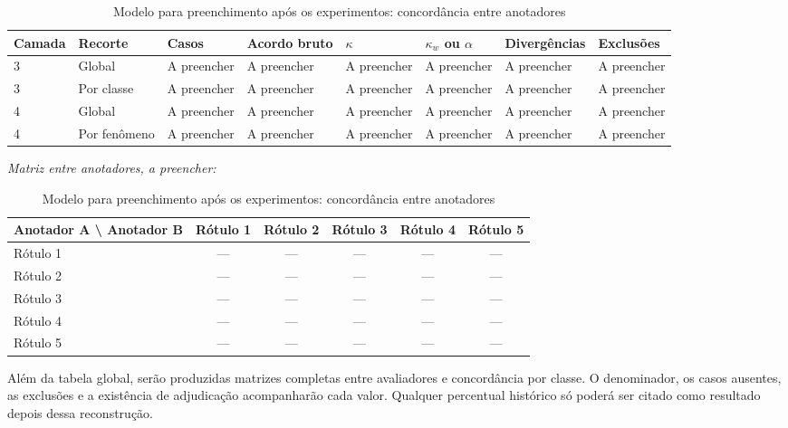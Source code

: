 \begin{table}[htbp]
\centering
\caption{Modelo para preenchimento após os experimentos: concordância entre anotadores}
\label{tab:modelo-concordancia}
\scriptsize
\begin{tabular}{|p{}|p{}|p{}|p{}|p{}|p{}|p{}|p{}|}
\hline
\textbf{Camada} & \textbf{Recorte} & \textbf{Casos} & \textbf{Acordo bruto} & \textbf{\(\kappa\)} & \textbf{\(\kappa_w\) ou \(\alpha\)} & \textbf{Divergências} & \textbf{Exclusões} \\
\hline
3 & Global & A preencher & A preencher & A preencher & A preencher & A preencher & A preencher \\
\hline
3 & Por classe & A preencher & A preencher & A preencher & A preencher & A preencher & A preencher \\
\hline
4 & Global & A preencher & A preencher & A preencher & A preencher & A preencher & A preencher \\
\hline
4 & Por fenômeno & A preencher & A preencher & A preencher & A preencher & A preencher & A preencher \\
\hline
\end{tabular}

\medskip
\textit{Matriz entre anotadores, a preencher:}

\begin{tabular}{|l|c|c|c|c|c|}
\hline
\textbf{Anotador A \textbackslash{} Anotador B} & \textbf{Rótulo 1} & \textbf{Rótulo 2} & \textbf{Rótulo 3} & \textbf{Rótulo 4} & \textbf{Rótulo 5} \\
\hline
Rótulo 1 & --- & --- & --- & --- & --- \\
\hline
Rótulo 2 & --- & --- & --- & --- & --- \\
\hline
Rótulo 3 & --- & --- & --- & --- & --- \\
\hline
Rótulo 4 & --- & --- & --- & --- & --- \\
\hline
Rótulo 5 & --- & --- & --- & --- & --- \\
\hline
\end{tabular}
\end{table}

Além da tabela global, serão produzidas matrizes completas entre avaliadores e concordância por classe. O denominador, os casos ausentes, as exclusões e a existência de adjudicação acompanharão cada valor. Qualquer percentual histórico só poderá ser citado como resultado depois dessa reconstrução.

